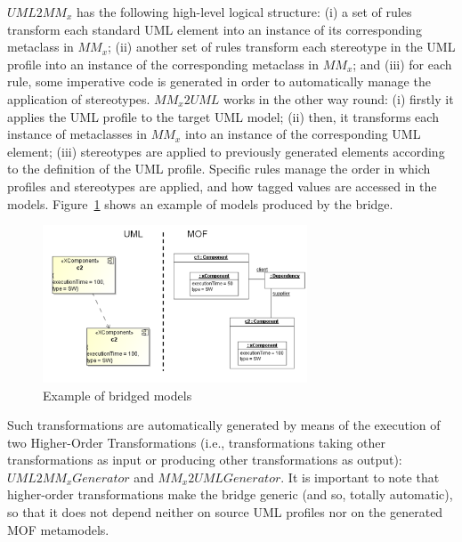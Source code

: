 $UML2MM_x$ has the following high-level logical structure: (i) a set of rules transform each standard UML element into an instance of its corresponding metaclass in $MM_x$; (ii) another set of rules transform each stereotype in the UML profile into an instance of the corresponding metaclass in $MM_x$; and (iii) for each rule, some imperative code is generated in order to automatically manage the application of stereotypes. $MM_x2UML$ works in the other way round: (i) firstly it applies the UML profile to the target UML model; (ii) then, it transforms each instance of metaclasses in $MM_x$ into an instance of the corresponding UML element; (iii) stereotypes are applied to  previously generated elements according to the definition of the UML profile. Specific rules manage the order in which profiles and stereotypes are applied, and how tagged values are accessed in the models. Figure~\ref{fig:modelingExample} shows an example of models produced by the bridge.
%
\vspace{-.4cm}
\begin{figure}[htbp]
	\centering
		\includegraphics[width=0.70\textwidth]{figures/modelingExample.png}
	\caption{Example of bridged models}
	\label{fig:modelingExample}
\end{figure}
\vspace{-.8cm}

Such transformations are automatically generated by means of the execution of two Higher-Order Transformations
(i.e., transformations taking other transformations as input or producing
other transformations as output): $UML2MM_xGenerator$ and $MM_x2UMLGenerator$. It is important to note that higher-order transformations make the bridge generic (and so, totally automatic), so that it does not depend neither on source UML profiles nor on the generated MOF metamodels.


